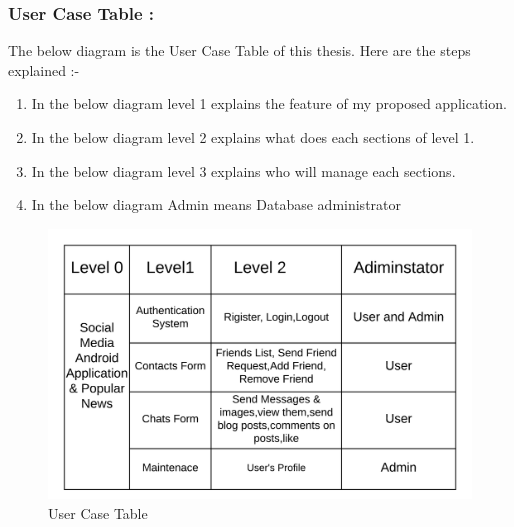 \subsubsection{User Case Table :}
\noindent
The below diagram is the User Case Table of this thesis. Here are the steps explained :-
\begin{enumerate}
	\setlength{\itemsep}{-0.3em}
	\item In the below diagram level 1 explains the feature of my proposed application.\\
	\item In the below diagram level 2 explains what does each sections of level 1.\\
	\item In the below diagram level 3 explains who will manage each sections.\\
	\item In the below diagram Admin means Database administrator
	
\end{enumerate}
\noindent
\begin{figure}[!ht]
		\centering
		\includegraphics[scale=0.8]{user-table.png}
		\caption{\label{img3} User Case Table}
\end{figure}


